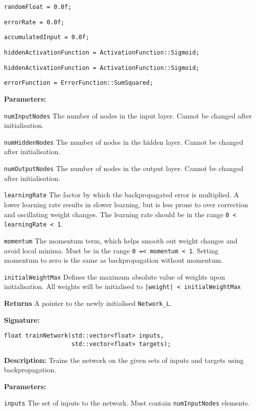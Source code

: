\documentclass[a4paper]{article}
\begin{document}
\lstinline{randomFloat = 0.0f;}

\lstinline{errorRate = 0.0f;}

\lstinline{accumulatedInput = 0.0f;}

\lstinline{hiddenActivationFunction = ActivationFunction::Sigmoid;}

\lstinline{hiddenActivationFunction = ActivationFunction::Sigmoid;}

\lstinline{errorFunction = ErrorFunction::SumSquared;}

\textbf{Parameters: }

\lstinline{numInputNodes} The number of nodes in the input layer. Cannot be changed after initialisation.

\lstinline{numHiddenNodes} The number of nodes in the hidden layer. Cannot be changed after initialisation.

\lstinline{numOutputNodes} The number of nodes in the output layer. Cannot be changed after initialisation.

\lstinline{learningRate} The factor by which the backpropagated error is multiplied. A lower learning rate results in slower learning, but is less prone to over correction and oscillating weight changes. The learning rate should be in the range \lstinline{0 < learningRate < 1}.

\lstinline{momentum} The momentum term, which helps smooth out weight changes and avoid local minima. Must be in the range \lstinline{0 =< momentum < 1}. Setting momentum to zero is the same as backpropagation without momentum.

\lstinline{initialWeightMax} Defines the maximum absolute value of weights upon initialisation. All weights will be initialised to \lstinline{|weight| < initialWeightMax} 

\textbf{Returns}
A pointer to the newly initialised \lstinline{Network_L}.

\hrulefill %

\textbf{Signature:} \begin{lstlisting}
float trainNetwork(std::vector<float> inputs,
                   std::vector<float> targets);
\end{lstlisting}

\textbf{Description: }
Trains the network on the given sets of inputs and targets using backpropagation.

\textbf{Parameters: }

\lstinline{inputs} The set of inputs to the network. Must contain \lstinline{numInputNodes} elements.
\end{document}

